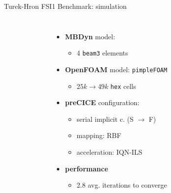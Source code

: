 \documentclass[10pt,t]{beamer}
\begin{document}
\begin{frame}{Turek-Hron FSI1 Benchmark: simulation}
\begin{columns}
\begin{figure}
    
    
\end{figure}

{}


\begin{itemize}
    \footnotesize
    \itemsep 10pt
    \item \textbf{MBDyn} model:
    \begin{itemize}
        \item 4 \texttt{beam3} elements
    \end{itemize}
    
    \item \textbf{OpenFOAM} model: \texttt{pimpleFOAM}
    \begin{itemize}
        \item $25k \to 49k$ \texttt{hex} cells
    \end{itemize}
    \item \textbf{preCICE} configuration:
    \begin{itemize}
        \item serial implicit c. (S $\to$ F)
        \item mapping: RBF
        \item acceleration: IQN-ILS
    \end{itemize}
    \item \textbf{performance}
    \begin{itemize}
        \item 2.8 avg. iterations to converge
    \end{itemize}
\end{itemize}

\end{columns}

\end{frame}
\end{document}
